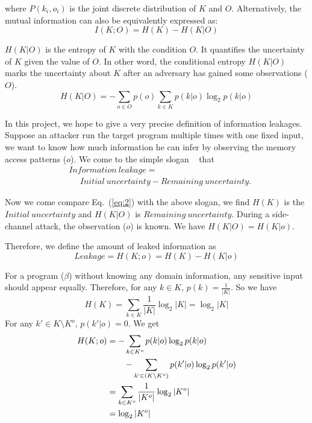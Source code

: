 where $P(k_i, o_i)$ is the joint discrete distribution of $K$ and $O$.
Alternatively, the mutual information can also be equivalently expressed as:
\begin{equation} \label{eq:2}
    I(K;O) = H(K) - H(K|O)
\end{equation}

$H(K|O)$ is the entropy of $K$ with the condition $O$. It quantifies the uncertainty
of $K$ given the value of $O$. In other word, the conditional entropy $H(K|O)$
marks the uncertainty about $K$ after an adversary has gained some observations
($O$).
\begin{equation}
    H(K|O) = - \sum_{o {\in} O} {p(o) \sum_{k {\in} K}{p(k|o)\log_2p(k|o)}}
\end{equation}

In this project, we hope to give a very precise definition of information
leakages. Suppose an attacker run the target program multiple times with one
fixed input, we want to know how much information he can infer by observing the
memory access patterns ($o$). We come to the simple slogan
~\cite{10.1007/978-3-642-00596-1_21} %
that
\begin{align*}
     & \mathit{Information\ leakage} =                                         \\
     & ~~~~~~ \mathit{Initial\ uncertainty} - \mathit{Remaining\ uncertainty}.
\end{align*}

Now we come compare Eq.~(\ref{eq:2}) with the above slogan, we find $H(K)$
is the $\mathit{Initial\ uncertainty}$ and $H(K|O)$ is $\mathit{Remaining\
uncertainty}$. During a side-channel attack, the observation ($o$) is known.  We
have $H(K|O) = H(K|o)$.

Therefore, we define the amount of leaked information as
\begin{displaymath}
    Leakage = H(K;o) = H(K) - H(K|o)
\end{displaymath}

For a program ($\beta$) without knowing any domain information, any sensitive
input should appear equally. Therefore, for any $k \in K$, $p(k) =
\frac{1}{|K|}$. So we have
$$H(K) = \sum_{k {\in} K}\frac{1}{|K|}\log_2{|K|} = \log_2{|K|}$$
For any $k' \in K \setminus K^o$, $p(k'|o) = 0$. We get
\begin{align*}
    H(K;o) & = - \sum_{k {\in} K^o}{p(k|o)\log_2p(k|o)}                         \\
           & \qquad   - \sum_{k` {\in} (K \setminus K^o)}{p(k'|o)\log_2p(k'|o)} \\
           & = \sum_{k {\in} K^o}\frac{1}{|K^o|}\log_2{|K^o|}                   \\
           & = \log_2{|K^o|}
\end{align*}


